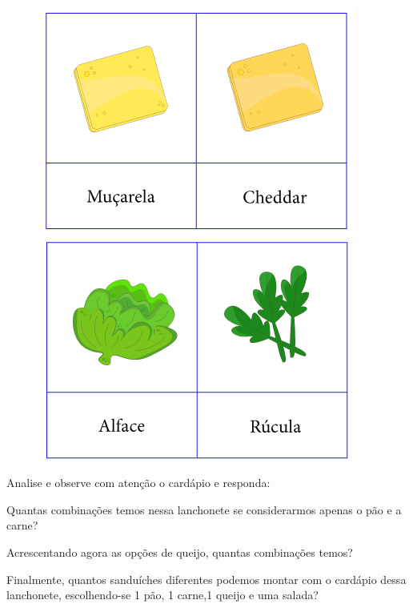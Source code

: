 \begin{figure}[htpb!]
\includegraphics[width=.5\textwidth]{../ilustracoes/MAT5/SAEB_5ANO_MAT_figura81c.png}
\includegraphics[width=.5\textwidth]{../ilustracoes/MAT5/SAEB_5ANO_MAT_figura81d.png}
\end{figure}

Analise e observe com atenção o cardápio e responda:

\begin{escolha}
\item
  Quantas combinações temos nessa lanchonete se considerarmos apenas o
  pão e a carne?

\bigskip
\bigskip

\item
  Acrescentando agora as opções de queijo, quantas combinações temos?

\bigskip

\item
  Finalmente, quantos sanduíches diferentes podemos montar com o
  cardápio dessa lanchonete, escolhendo-se 1 pão, 1 carne,1 queijo e uma
  salada?

\end{escolha}


